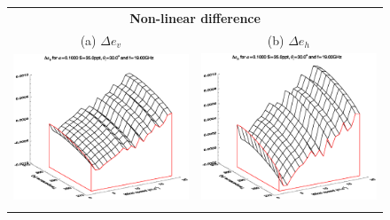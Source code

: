 \begin{figure}[htp]
  \centering
  \begin{tabular}{c c}
    \multicolumn{2}{c}{\sffamily\textbf{Non-linear difference}}\\
    \textsf{(a)} $\Delta e_v$ &
    \textsf{(b)} $\Delta e_h$ \\
    \includegraphics[bb=110 240 508 540,clip,scale=0.5]{graphics/Model/FWDTL/Initial/FWDdev_a0.1000_s35.0ppt_z30.0_19.00GHz.eps} &
    \includegraphics[bb=110 240 508 540,clip,scale=0.5]{graphics/Model/FWDTL/Initial/FWDdeh_a0.1000_s35.0ppt_z30.0_19.00GHz.eps} \\\\

\end{tabular}
\end{figure}
